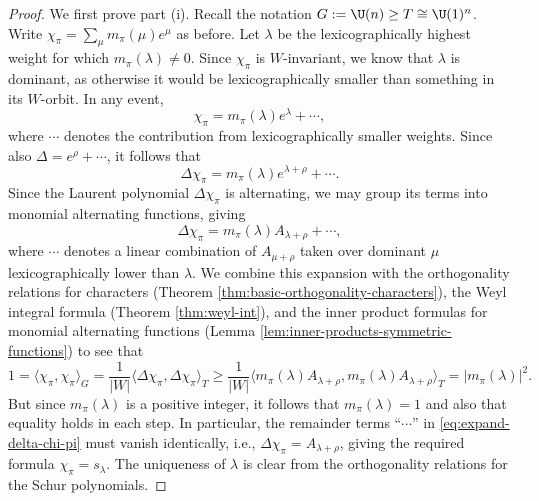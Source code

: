 \documentclass[reqno]{amsart} 
\begin{document}
\begin{proof}
  We first prove part (i).  Recall the notation $G := \U(n) \geq T \cong \U(1)^n$.  Write $\chi_\pi = \sum_{\mu} m_\pi(\mu) e^\mu$ as before.  Let $\lambda$ be the lexicographically highest weight for which $m_\pi(\lambda) \neq 0$.  Since $\chi_\pi$ is $W$-invariant, we know that $\lambda$ is dominant, as otherwise it would be lexicographically smaller than something in its $W$-orbit.  In any event,
  \begin{equation}
    \chi_\pi = m_\pi(\lambda) e^\lambda + \dotsb,
  \end{equation}
  where $\dotsb$ denotes the contribution from lexicographically smaller weights.  Since also $\Delta = e^\rho + \dotsb$, it follows that
  \begin{equation}
    \Delta \chi_\pi = m_\pi(\lambda) e^{\lambda + \rho} + \dotsb.
  \end{equation}
  Since the Laurent polynomial $\Delta \chi_\pi$ is alternating, we may group its terms into monomial alternating functions, giving
  \begin{equation}\label{eq:expand-delta-chi-pi}
    \Delta \chi_\pi = m_\pi(\lambda) A_{\lambda + \rho} + \dotsb,
  \end{equation}
  where $\dotsb$ denotes a linear combination of $A_{\mu + \rho}$ taken over dominant $\mu$ lexicographically lower than $\lambda$.  We combine this expansion with the orthogonality relations for characters (Theorem \ref{thm:basic-orthogonality-characters}), the Weyl integral formula (Theorem \ref{thm:weyl-int}), and the inner product formulas for monomial alternating functions (Lemma \ref{lem:inner-products-symmetric-functions}) to see that
  \begin{equation}\label{eq:}
    1
    = \langle \chi_\pi, \chi_\pi \rangle_G
    =
    \frac{1}{|W|}
    \langle     \Delta \chi_\pi
    ,    \Delta \chi_\pi
    \rangle_T
    \geq
    \frac{1}{|W|}
    \langle     m_\pi(\lambda) A_{\lambda + \rho},     m_\pi(\lambda) A_{\lambda + \rho} \rangle_T
    =
    |m_\pi(\lambda)|^2.
  \end{equation}
  But since $m_\pi(\lambda)$ is a positive integer, it follows that $m_\pi(\lambda) = 1$ and also that equality holds in each step.  In particular, the remainder terms ``$\dotsb$'' in \eqref{eq:expand-delta-chi-pi} must vanish identically, i.e., $\Delta \chi_\pi = A_{\lambda+\rho}$, giving the required formula $\chi_\pi = s_\lambda$.  The uniqueness of $\lambda$ is clear from the orthogonality relations for the Schur polynomials.


\end{proof}
\end{document}
